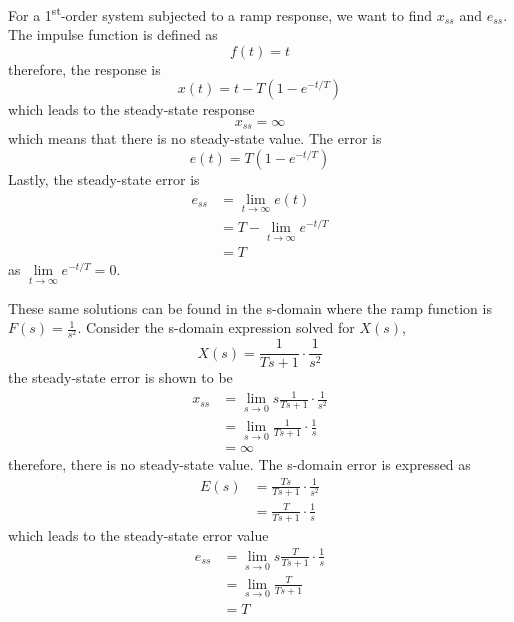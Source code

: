 \documentclass[12pt,letter]{article}
\numberwithin{ex}{section} %
\numberwithin{re}{section} %
\numberwithin{equation}{section}	%
\begin{document}
For a 1\textsuperscript{st}-order system subjected to a ramp response, we want to find $x_{ss}$ and $e_{ss}$. The impulse function is defined as
\begin{equation}
f(t) = t
\end{equation}
therefore, the response is
\begin{equation}
x(t) = t - T(1-e^{-t/T})
\end{equation}
which leads to the steady-state response
\begin{equation}
x_{ss} =  \infty 
\end{equation}
which means that there is no steady-state value. The error is
\begin{equation}
e(t) = T(1-e^{-t/T})
\end{equation}
Lastly, the steady-state error is
\begin{align}
e_{ss} &= \lim\limits_{t \rightarrow \infty}e(t)  \\
&= T - \lim\limits_{t \rightarrow \infty}e^{-t/T} \nonumber \\
&= T \nonumber
\end{align}
as $\lim\limits_{t \rightarrow \infty}e^{-t/T} = 0$.

These same solutions can be found in the s-domain where the ramp function is $F(s)=\frac{1}{s^2}$. Consider the s-domain expression solved for $X(s)$, 
\begin{equation}
X(s) = \frac{1}{Ts +1} \cdot \frac{1}{s^2} 
\end{equation}
the steady-state error is shown to be
\begin{align}
x_{ss} &= \lim\limits_{s \rightarrow 0} s \frac{1}{Ts+1} \cdot \frac{1}{s^2} \\
&= \lim\limits_{s \rightarrow 0} \frac{1}{Ts+1} \cdot \frac{1}{s}  \nonumber \\
&= \infty    \nonumber 
\end{align}
therefore, there is no steady-state value. The s-domain error is expressed as
\begin{align}
E(s) &= \frac{Ts}{Ts +1} \cdot \frac{1}{s^2} \\
&= \frac{T}{Ts +1} \cdot \frac{1}{s}  \nonumber 
\end{align}
which leads to the steady-state error value
\begin{align}
e_{ss} &= \lim\limits_{s \rightarrow 0}  s \frac{T}{Ts+1} \cdot \frac{1}{s} \\
&= \lim\limits_{s \rightarrow 0}   \frac{T}{Ts+1} \nonumber \\
&= T   \nonumber 
\end{align}
\end{document}
